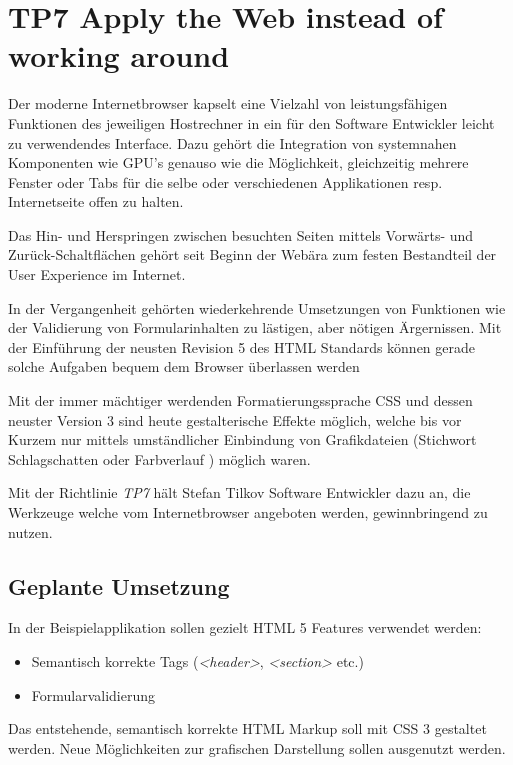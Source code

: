 \section{TP7 Apply the Web instead of working around}
\label{sec:principle-tp7-apply-the-web}

Der moderne Internetbrowser kapselt eine Vielzahl von leistungsfähigen Funktionen des jeweiligen Hostrechner in ein für den Software Entwickler leicht zu verwendendes Interface. Dazu gehört die Integration von systemnahen Komponenten wie \gls{GPU}'s \cite{webgl} genauso wie die Möglichkeit, gleichzeitig mehrere Fenster oder Tabs für die selbe oder verschiedenen Applikationen resp. Internetseite offen zu halten.

Das Hin- und Herspringen zwischen besuchten Seiten mittels Vorwärts- und Zurück-Schaltflächen gehört seit Beginn der Webära zum festen Bestandteil der User Experience im Internet.

In der Vergangenheit gehörten wiederkehrende Umsetzungen von Funktionen wie der Validierung von Formularinhalten zu lästigen, aber nötigen Ärgernissen. Mit der Einführung der neusten Revision 5 des HTML Standards können gerade solche Aufgaben bequem dem Browser \cite{HTML5Forms} überlassen werden

Mit der immer mächtiger werdenden Formatierungssprache CSS und dessen neuster Version 3 sind heute gestalterische Effekte möglich, welche bis vor Kurzem nur mittels umständlicher Einbindung von Grafikdateien (Stichwort Schlagschatten \cite{css-box-shadow} oder Farbverlauf \cite{css-gradient}) möglich waren.

Mit der Richtlinie \emph{TP7} hält Stefan Tilkov Software Entwickler dazu an, die Werkzeuge welche vom Internetbrowser angeboten werden, gewinnbringend zu nutzen.


\subsection*{Geplante Umsetzung}

In der Beispielapplikation sollen gezielt HTML 5 Features verwendet werden:

\begin{itemize}
	\item Semantisch korrekte Tags (\emph{<header>}, \emph{<section>} etc.) \cite{SemanticHTML}
	\item Formularvalidierung \cite{HTML5Forms}
\end{itemize}

Das entstehende, semantisch korrekte HTML Markup soll mit CSS 3 gestaltet werden. Neue Möglichkeiten zur grafischen Darstellung sollen ausgenutzt werden.

